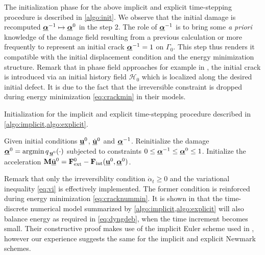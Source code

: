 The initialization phase for the above implicit and explicit time-stepping procedure is described in \cref{algo:init}. We observe that the initial damage is recomputed $\dvec^{-1}\mapsto\dvec^0$ in the step 2. The role of $\dvec^{-1}$ is to bring some \emph{a priori} knowledge of the damage field resulting from a previous calculation or more frequently to represent an initial crack $\dvec^{-1}=1$ on $\Gamma_0$. This step thus renders it compatible with the initial displacement condition and the energy minimization structure. Remark that in phase field approaches for example in \cite{BordenVerhooselScottHughesLandis:2012}, the initial crack is introduced via an initial history field $\mathcal{H}_0$ which is localized along the desired initial defect. It is due to the fact that the irreversible constraint is dropped during energy minimization \eqref{eq:crackmin} in their models.
\begin{algorithm}[htbp]
\caption{Initialization for the implicit and explicit time-stepping procedure described in \cref{algo:implicit,algo:explicit}.} \label{algo:init}
\begin{algorithmic}[1]\linespread{1.2}\selectfont\normalsize
\State Given initial conditions $\uvec^0$, $\dot{\uvec}^0$ and $\dvec^{-1}$.
\State Reinitialize the damage $\dvec^0=\operatorname{arg min}q_{\,\uvec^0}(\cdot)$ subjected to constraints $0\leq\dvec^{-1}\leq\dvec^0\leq 1$.
\State Initialize the acceleration $\vec{M}\ddot{\uvec}^0=\vec{F}_\mathrm{ext}^0-\vec{F}_\mathrm{int}(\uvec^0,\dvec^0)$.
\end{algorithmic}
\end{algorithm}

\begin{remark}
Remark that only the irreversiblity condition $\dot{\alpha}_t\geq 0$ and the variational inequality \eqref{eq:vi} is effectively implemented. The former condition is reinforced during energy minimization \eqref{eq:cracknummin}. It is shown in \cite{LarsenOrtnerSuli:2010} that the time-discrete numerical model summarized by \cref{algo:implicit,algo:explicit} will also balance energy as required in \eqref{eq:dyngdeb}, when the time increment becomes small. Their constructive proof makes use of the implicit Euler scheme used in \cite{Bourdin:2011}, however our experience suggests the same for the implicit and explicit Newmark schemes.
\end{remark}

